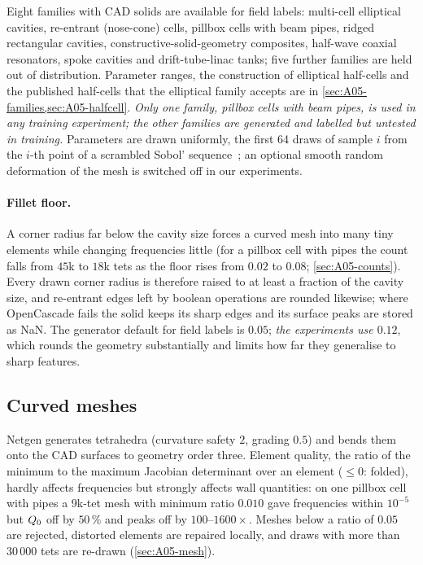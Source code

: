 Eight families with CAD solids are available for field labels: multi-cell elliptical cavities, re-entrant (nose-cone) cells, pillbox cells with beam pipes, ridged rectangular cavities, constructive-solid-geometry composites, half-wave coaxial resonators, spoke cavities and drift-tube-linac tanks; five further families are held out of distribution.
Parameter ranges, the construction of elliptical half-cells and the published half-cells that the elliptical family accepts are in \cref{sec:A05-families,sec:A05-halfcell}.
\emph{Only one family, pillbox cells with beam pipes, is used in any training experiment; the other families are generated and labelled but untested in training.}
Parameters are drawn uniformly, the first 64 draws of sample $i$ from the $i$-th point of a scrambled Sobol' sequence~\cite{sobol1967distribution,virtanen2020scipy}; an optional smooth random deformation of the mesh is switched off in our experiments.

\paragraph{Fillet floor.}
A corner radius far below the cavity size forces a curved mesh into many tiny elements while changing frequencies little (for a pillbox cell with pipes the count falls from $45$k to $18$k tets as the floor rises from $0.02$ to $0.08$; \cref{sec:A05-counts}).
Every drawn corner radius is therefore raised to at least a fraction of the cavity size, and re-entrant edges left by boolean operations are rounded likewise; where OpenCascade fails the solid keeps its sharp edges and its surface peaks are stored as NaN.
The generator default for field labels is $0.05$; \emph{the experiments use $0.12$}, which rounds the geometry substantially and limits how far they generalise to sharp features.

\subsection{Curved meshes}\label{sec:05-mesh}

Netgen generates tetrahedra (curvature safety $2$, grading $0.5$) and bends them onto the CAD surfaces to geometry order three.
Element quality, the ratio of the minimum to the maximum Jacobian determinant over an element ($\le0$: folded), hardly affects frequencies but strongly affects wall quantities: on one pillbox cell with pipes a 9k-tet mesh with minimum ratio $0.010$ gave frequencies within $10^{-5}$ but $\Qz$ off by $50\,\%$ and peaks off by $100$--$1600\times$.
Meshes below a ratio of $0.05$ are rejected, distorted elements are repaired locally, and draws with more than $30\,000$ tets are re-drawn (\cref{sec:A05-mesh}).

